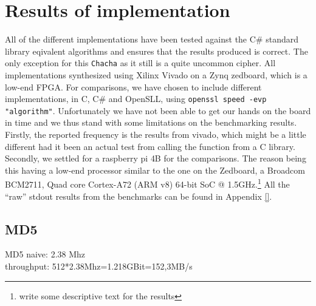 \documentclass[a4paper]{article}
\begin{document}
\section{Results of implementation}
\label{sec:orgedc205f}
All of the different implementations have been tested against the C\# standard library eqivalent algorithms and ensures that the results produced is correct. The only exception for this \texttt{Chacha} as it still is a quite uncommon cipher. All implementations synthesized using Xilinx Vivado on a Zynq zedboard, which is a low-end FPGA. For comparisons, we have chosen to include different implementations, in C, C\# and OpenSLL, using \texttt{openssl speed -evp "algorithm"}. Unfortunately we have not been able to get our hands on the board in time and we thus stand with some limitations on the benchmarking results. Firstly, the reported frequency is the results from vivado, which might be a little different had it been an actual test from calling the function from a C library.  Secondly, we settled for a raspberry pi 4B for the comparisons. The reason being this having a low-end processor similar to the one on the Zedboard, a Broadcom BCM2711, Quad core Cortex-A72 (ARM v8) 64-bit SoC @ 1.5GHz.\footnote{write some descriptive text for the results} All the ``raw'' stdout results from the benchmarks can be found in Appendix \ref{}.
\subsection{MD5}
\label{sec:orgebef477}
MD5 naive: 2.38 Mhz\\
throughput: 512*2.38Mhz=1.218GBit=152,3MB/s
\end{document}
